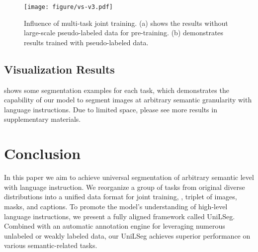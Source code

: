 \documentclass[10pt,twocolumn,letterpaper]{article}
\newcommand{\MethodName}{UniLSeg\xspace}
\begin{document}
\begin{figure}[t]
    \centering
    \texttt{[image: figure/vs-v3.pdf]}
    \vspace{-15pt}
    \caption{Influence of multi-task joint training. (a) shows the results without large-scale pseudo-labeled data for pre-training. (b) demonstrates results trained with pseudo-labeled data.}
    \label{fig:multi-task}
    \vspace{-10pt}
\end{figure}




\subsection{Visualization Results}
 shows some segmentation examples for each task, which demonstrates the capability of our model to segment images at arbitrary semantic granularity with language instructions. Due to limited space, please see more results in supplementary materials.




\section{Conclusion}
In this paper we aim to achieve universal segmentation of arbitrary semantic level with language instruction. 
We reorganize a group of tasks from original diverse distributions into a unified data format for joint training, \ie, triplet of images, masks, and captions. 
To promote the model's understanding of high-level language instructions, we present a fully aligned framework called \MethodName. Combined with an automatic annotation engine for leveraging numerous unlabeled or weakly labeled data, our \MethodName achieves superior performance on various semantic-related tasks.

\clearpage
{
    \small
    
    
}
\end{document}
